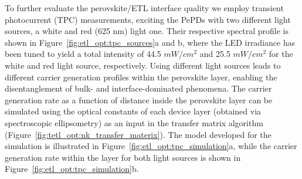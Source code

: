To further evaluate the perovskite/ETL interface quality we employ transient photocurrent (TPC) measurements, exciting the PePDs with two different light sources, a white and red (625 nm) light one. Their respective spectral profile is shown in Figure~\ref{fig:etl_opt:tpc_sources}a and b, where the LED irradiance has been tuned to yield a total intensity of 44.5 $mW/cm^2$ and 25.5 $mW/cm^2$ for the white and red light source, respectively. Using different light sources leads to different carrier generation profiles within the perovskite layer, enabling the disentanglement of bulk- and interface-dominated phenomena. The carrier generation rate as a function of distance inside the perovskite layer can be simulated using the optical constants of each device layer (obtained via spectroscopic ellipsometry) as an input in the transfer matrix algorithm (Figure~\ref{fig:tetl_opt:nk_transfer_materix})\cite{Burkhard2010AccountingCells}. The model developed for the simulation is illustrated in Figure~\ref{fig:etl_opt:tpc_simulation}a, while  the carrier generation rate within the  layer for both light sources is shown in Figure~\ref{fig:etl_opt:tpc_simulation}b. 



